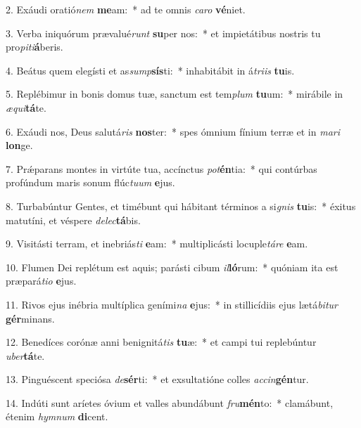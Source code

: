 2. Exáudi oratió\textit{nem} \textbf{me}am:~*  ad te omnis \textit{ca}\textit{ro} \textbf{vé}niet.\

3. Verba iniquórum prævalué\textit{runt} \textbf{su}per nos:~*  et impietátibus nostris tu pro\textit{pi}\textit{ti}\textbf{á}beris.\

4. Beátus quem elegísti et as\textit{sump}\textbf{sís}ti:~*  inhabitábit in á\textit{tri}\textit{is} \textbf{tu}is.\

5. Replébimur in bonis domus tuæ, sanctum est tem\textit{plum} \textbf{tu}um:~*  mirábile in \textit{æ}\textit{qui}\textbf{tá}te.\

6. Exáudi nos, Deus salutá\textit{ris} \textbf{nos}ter:~*  spes ómnium fínium terræ et in \textit{ma}\textit{ri} \textbf{lon}ge.\

7. Prǽparans montes in virtúte tua, accínctus \textit{pot}\textbf{én}tia:~*  qui contúrbas profúndum maris sonum flúc\textit{tu}\textit{um} \textbf{e}jus.\

8. Turbabúntur Gentes, et timébunt qui hábitant términos a si\textit{gnis} \textbf{tu}is:~*  éxitus matutíni, et véspere \textit{de}\textit{lec}\textbf{tá}bis.\

9. Visitásti terram, et inebriás\textit{ti} \textbf{e}am:~*  multiplicásti locuple\textit{tá}\textit{re} \textbf{e}am.\

10. Flumen Dei replétum est aquis; parásti cibum \textit{il}\textbf{ló}rum:~*  quóniam ita est præpará\textit{ti}\textit{o} \textbf{e}jus.\

11. Rivos ejus inébria multíplica geními\textit{na} \textbf{e}jus:~*  in stillicídiis ejus lætá\textit{bi}\textit{tur} \textbf{gér}minans.\

12. Benedíces corónæ anni benignitá\textit{tis} \textbf{tu}æ:~*  et campi tui replebúntur \textit{u}\textit{ber}\textbf{tá}te.\

13. Pinguéscent speciósa \textit{de}\textbf{sér}ti:~*  et exsultatióne colles \textit{ac}\textit{cin}\textbf{gén}tur.\

14. Indúti sunt aríetes óvium et valles abundábunt \textit{fru}\textbf{mén}to:~*  clamábunt, étenim \textit{hym}\textit{num} \textbf{di}cent.\

